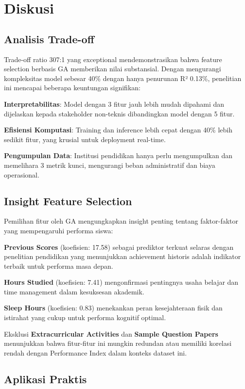 \documentclass[conference]{IEEEtran}
\begin{document}
\section{Diskusi}

\subsection{Analisis Trade-off}

Trade-off ratio 307:1 yang exceptional mendemonstrasikan bahwa feature selection berbasis GA memberikan nilai substansial. Dengan mengurangi kompleksitas model sebesar 40\% dengan hanya penurunan R² 0.13\%, penelitian ini mencapai beberapa keuntungan signifikan:

\textbf{Interpretabilitas}: Model dengan 3 fitur jauh lebih mudah dipahami dan dijelaskan kepada stakeholder non-teknis dibandingkan model dengan 5 fitur.

\textbf{Efisiensi Komputasi}: Training dan inference lebih cepat dengan 40\% lebih sedikit fitur, yang krusial untuk deployment real-time.

\textbf{Pengumpulan Data}: Institusi pendidikan hanya perlu mengumpulkan dan memelihara 3 metrik kunci, mengurangi beban administratif dan biaya operasional.

\subsection{Insight Feature Selection}

Pemilihan fitur oleh GA mengungkapkan insight penting tentang faktor-faktor yang mempengaruhi performa siswa:

\textbf{Previous Scores} (koefisien: 17.58) sebagai prediktor terkuat selaras dengan penelitian pendidikan yang menunjukkan achievement historis adalah indikator terbaik untuk performa masa depan.

\textbf{Hours Studied} (koefisien: 7.41) mengonfirmasi pentingnya usaha belajar dan time management dalam kesuksesan akademik.

\textbf{Sleep Hours} (koefisien: 0.83) menekankan peran kesejahteraan fisik dan istirahat yang cukup untuk performa kognitif optimal.

Eksklusi \textbf{Extracurricular Activities} dan \textbf{Sample Question Papers} menunjukkan bahwa fitur-fitur ini mungkin redundan atau memiliki korelasi rendah dengan Performance Index dalam konteks dataset ini.

\subsection{Aplikasi Praktis}
\end{document}
